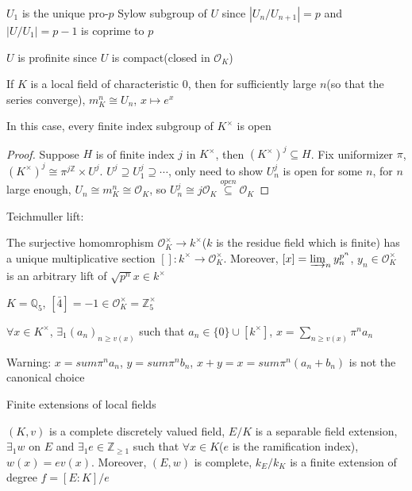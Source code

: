 \documentclass[main]{subfiles}
\begin{document}
$U_1$ is the unique pro-$p$ Sylow subgroup of $U$ since $|U_n/U_{n+1}|=p$ and $|U/U_1|=p-1$ is coprime to $p$

$U$ is profinite since $U$ is compact(closed in $\mathcal O_K$)

\begin{remark}
If $K$ is a local field of characteristic 0, then for sufficiently large $n$(so that the series converge), $m_K^n\cong U_n$, $x\mapsto e^x$
\end{remark}

\begin{corollary}
In this case, every finite index subgroup of $K^\times$ is open
\end{corollary}

\begin{proof}
Suppose $H$ is of finite index $j$ in $K^\times$, then $(K^\times)^j\subseteq H$. Fix uniformizer $\pi$, $(K^\times)^j\cong\pi^{j\mathbb Z}\times U^j$. $U^j\supseteq U_1^j\supseteq\cdots$, only need to show $U_n^j$ is open for some $n$, for $n$ large enough, $U_n\cong m_K^n\cong\mathcal O_K$, so $U_n^j\cong j\mathcal O_K\overset{open}{\subseteq}\mathcal O_K$
\end{proof}

Teichmuller lift:

\begin{fact}
The surjective homomrophism $\mathcal O_K^\times\to k^\times$($k$ is the residue field which is finite) has a unique multiplicative section $[]:k^\times\to\mathcal O_K^\times$. Moreover, $[x]=\varinjlim_ny_n^{p^n}$, $y_n\in\mathcal O_K^\times$ is an arbitrary lift of $\sqrt{p^n}{x}\in k^\times$
\end{fact}

\begin{example}
$K=\mathbb Q_5$, $[\bar4]=-1\in\mathcal O_K^\times=\mathbb Z_5^\times$
\end{example}

\begin{fact}
$\forall x\in K^\times$, $\exists_1(a_n)_{n\geq v(x)}$ such that $a_n\in\{0\}\cup[k^\times]$, $x=\sum_{n\geq v(x)}\pi^n a_n$
\end{fact}

Warning: $x=sum \pi^na_n$, $y=sum \pi^nb_n$, $x+y=x=sum \pi^n(a_n+b_n)$ is not the canonical choice

Finite extensions of local fields

\begin{theorem}[Serre II.2]
$(K,v)$ is a complete discretely valued field, $E/K$ is a separable field extension, $\exists_1 w$ on $E$ and $\exists_1 e\in\mathbb Z_{\geq1}$ such that $\forall x\in K$($e$ is the ramification index), $w(x)=ev(x)$. Moreover, $(E,w)$ is complete, $k_E/k_K$ is a finite extension of degree $f=[E:K]/e$
\end{theorem}
\end{document}
